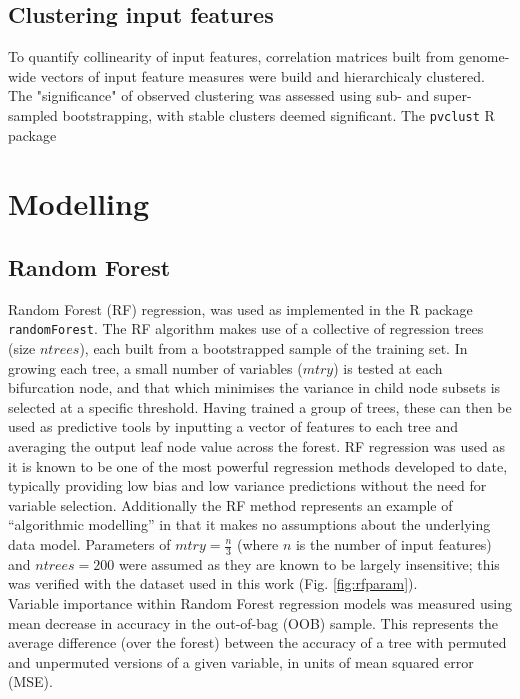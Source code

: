 \documentclass[a4paper,10pt,oneside]{book}
\begin{document}
\subsection{Clustering input features}

To quantify collinearity of input features, correlation matrices built from genome-wide vectors of input feature measures were build and hierarchicaly clustered. The "significance" of observed clustering was assessed using sub- and super-sampled bootstrapping, with stable clusters deemed significant. The \texttt{pvclust} R package

\section{Modelling}\label{modelling}

\subsection{Random Forest}\label{sec:rf}

Random Forest (RF) regression,\cite{Breiman2001a}  was used
as implemented in the R package \texttt{randomForest}.\cite{Liaw2002}
The RF algorithm makes use of a collective of regression trees (size $ntrees$), each built from a
bootstrapped sample of the training set. In growing each tree, a small
number of variables ($mtry$) is tested at each bifurcation node, and that which minimises the
variance in child node subsets is selected at a specific
threshold. Having trained a group of trees, these can then be used as
predictive tools by inputting a vector of features to each tree and
averaging the output leaf node value across the forest. RF regression
was used as it is known to be one of the most powerful regression
methods developed to date,\cite{Svetnik2003, Cutler2007} typically
providing low bias and low variance predictions without the need for
variable selection.\cite{Dasgupta2012}
Additionally the RF method represents an example of ``algorithmic
modelling''\cite{Breiman2001b} in that it makes no assumptions about the
underlying data model.
Parameters of $mtry = \frac{n}{3}$ (where $n$ is the number of input features) and $ntrees =
200$ were assumed as they are known to be
largely insensitive;\cite{Dasgupta2012, Hastie2001} this was verified
with the dataset used in this work (Fig. \ref{fig:rfparam}). \\

Variable importance within Random Forest regression models was measured
using mean decrease in accuracy in the out-of-bag (OOB) sample. This
represents the average difference (over the forest) between the accuracy
of a tree with permuted and unpermuted versions of a given variable, in
units of mean squared error (MSE).\citep{Cutler2007, Dasgupta2012}
\end{document}
